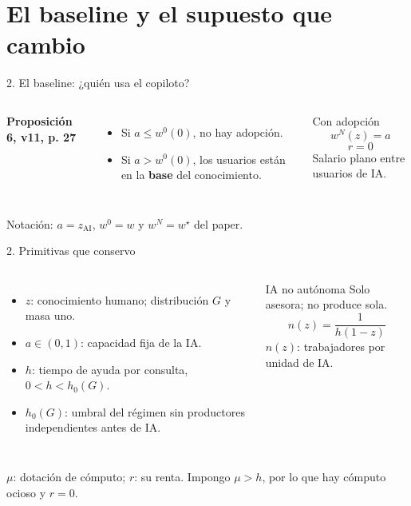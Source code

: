 \documentclass[aspectratio=169,11pt]{beamer}
\begin{document}
\section{El baseline y el supuesto que cambio}
\begin{frame}{2. El baseline: ¿quién usa el copiloto?}
\begin{columns}[T]
\textbf{Proposición 6, v11, p. 27}
\begin{itemize}
\item Si $a\leq w^0(0)$, no hay adopción.
\item Si $a>w^0(0)$, los usuarios están en la \textbf{base} del conocimiento.
\end{itemize}
\begin{block}{Con adopción}
\[w^N(z)=a\]
\[r=0\]
Salario plano entre usuarios de IA.
\end{block}
\end{columns}
\medskip
\begin{keybox}
Notación: $a=z_{\mathrm{AI}}$, $w^0=w$ y $w^N=w^\star$ del paper.
\end{keybox}
\end{frame}
\begin{frame}{2. Primitivas que conservo}
\begin{columns}[T]
\begin{itemize}
\item $z$: conocimiento humano; distribución $G$ y masa uno.
\item $a\in(0,1)$: capacidad fija de la IA.
\item $h$: tiempo de ayuda por consulta, $0<h<h_0(G)$.
\item $h_0(G)$: umbral del régimen sin productores independientes antes de IA.
\end{itemize}
\begin{block}{IA no autónoma}
Solo asesora; no produce sola.
\[n(z)=\frac{1}{h(1-z)}\]
$n(z)$: trabajadores por unidad de IA.
\end{block}
\end{columns}
\medskip
$\mu$: dotación de cómputo; $r$: su renta. Impongo $\mu>h$, por lo que hay cómputo ocioso y $r=0$.
\end{frame}
\end{document}
